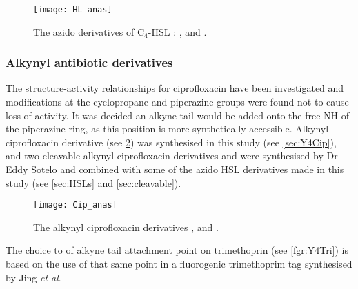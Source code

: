 \begin{figure}[H]
	\begin{center}
		\texttt{[image: HL\_anas]}
		\caption{The azido derivatives of C$_4$-HSL :  ,  and . \label{fig:HL_anas}}
	\end{center}
\end{figure}


\subsubsection{Alkynyl antibiotic derivatives}


The structure-activity relationships for ciprofloxacin have been investigated \cite{Renau1996} and modifications at the cyclopropane and piperazine groups were found not to cause loss of activity. It was decided an alkyne tail would be added onto the free NH of the piperazine ring, as this position is more synthetically accessible. Alkynyl ciprofloxacin derivative  (see \ref{fgr:Cip_anas}) was synthesised in this study (see \ref{sec:Y4Cip}), and two cleavable alkynyl ciprofloxacin derivatives  and  were synthesised by Dr Eddy Sotelo and combined with some of the azido HSL derivatives made in this study (see \ref{sec:HSLs} and \ref{sec:cleavable}).


\begin{figure}[H]
	\begin{center}
		\texttt{[image: Cip\_anas]}
		\caption{The alkynyl ciprofloxacin derivatives ,  and . \label{fgr:Cip_anas}}
	\end{center}
\end{figure}



The choice to of alkyne tail attachment point on trimethoprin  (see \ref{fgr:Y4Tri}) is based on the use of that same point in a fluorogenic trimethoprim tag synthesised by Jing \textit{et al}\cite{Jing2013}.

